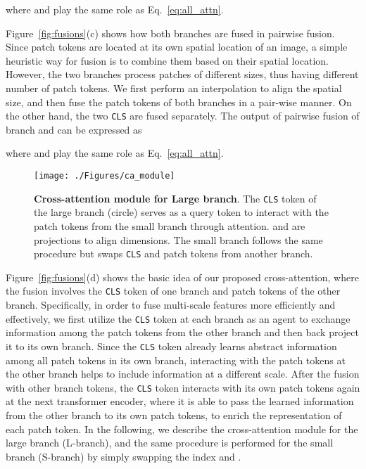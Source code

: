 \documentclass[10pt,twocolumn,letterpaper]{article}
\def\clstoken{\texttt{CLS}\xspace}
\newcommand{\myparagraph}[1]{\vspace{1mm} \noindent {\textbf{#1}}}
\begin{document}
where  and  play the same role as Eq.~\ref{eq:all_attn}.

\vspace{1mm}
\myparagraph{Pairwise Fusion.} 
Figure~\ref{fig:fusions}(c) shows how both branches are fused in pairwise fusion. Since patch tokens are located at its own spatial location of an image, a simple heuristic way for fusion is to combine them based on their spatial location. However, the two branches process patches of different sizes, thus having different number of patch tokens. We first perform an interpolation to align the spatial size, and then fuse the patch tokens of both branches in a pair-wise manner. On the other hand, the two \clstoken are fused separately. The output  of pairwise fusion of branch  and  can be expressed as
 
where  and  play the same role as Eq.~\ref{eq:all_attn}.


\begin{figure}[tb!]
    \centering
    \texttt{[image: ./Figures/ca\_module]}
    \caption{\textbf{Cross-attention module for Large branch}. The \clstoken token of the large branch (circle) serves as a query token to interact with the patch tokens from the small branch through attention.
     and  are projections to align dimensions. The small branch follows the same procedure but swaps \clstoken and patch tokens from another branch. 
    }
    \label{fig:ca_module} 
\end{figure}


\myparagraph{Cross-Attention Fusion.}
Figure~\ref{fig:fusions}(d) shows the basic idea of our proposed cross-attention, where the fusion involves the \clstoken token of one branch and patch tokens of the other branch. 
Specifically, in order to fuse multi-scale features more efficiently and effectively, we first utilize the \clstoken token at each branch as an agent to exchange information among the patch tokens from the other branch and then back project it to its own branch. Since the \clstoken token already learns abstract information among all patch tokens in its own branch, interacting with the patch tokens at the other branch helps to include information at a different scale. After the fusion with other branch tokens, the \clstoken token interacts with its own patch tokens again at the next transformer encoder, where it is able to pass the learned information from the other branch to its own patch tokens, to enrich the representation of each patch token. In the following, we describe the cross-attention module for the large branch (L-branch), and the same procedure is performed for the small branch (S-branch) by simply swapping the index  and . 
\end{document}
